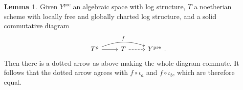 \documentclass[11pt]{amsart}
\theoremstyle{definition}
\theoremstyle{definition}
\newtheorem{lemma}[theorem]{Lemma}
\newcommand{\cM}{\mathcal{M}}
\newcommand{\cal}{\mathcal}
\def\cM{{\cal M}}
\begin{document}
\begin{lemma}\label{lem:ElementaryFanFactors}
    Given $Y^\text{pre}$ an algebraic space with log structure, $T$ a noetherian scheme with locally free and globally charted log structure, and a solid commutative diagram $$\begin{tikzcd}
T^\rho \arrow[r] \arrow[rr, bend left=20,"f"] & T \arrow[r, dashed] & Y^\text{pre}
\end{tikzcd}.
$$
Then there is a dotted arrow as above making the whole diagram commute. It follows that the dotted arrow agrees with $f\circ \iota_a$ and $f\circ \iota_b$, which are therefore equal. 
\end{lemma}

\end{document}
